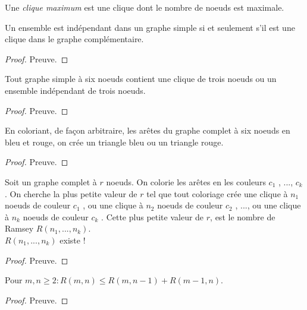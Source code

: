 \begin{mydef}
  Une \emph{clique maximum} est une clique dont le nombre de noeuds est maximale.
\end{mydef}

\begin{mytheo}
  Un ensemble est indépendant dans un graphe simple si et seulement s’il est une clique dans le graphe complémentaire.
  \begin{proof}
     Preuve.
  \end{proof}
\end{mytheo}

\begin{mytheo} 
  Tout graphe simple à six noeuds contient une clique de trois noeuds ou un ensemble indépendant de trois noeuds.
  \begin{proof}
     Preuve.
  \end{proof}
\end{mytheo}

\begin{mytheo} 
  En coloriant, de façon arbitraire, les arêtes du graphe complet à six noeuds en bleu et rouge, on crée un triangle bleu ou un triangle rouge.
  \begin{proof}
     Preuve.
  \end{proof}
\end{mytheo}

\begin{mytheo} 
  Soit un graphe complet à $r$ noeuds. On colorie les arêtes en les couleurs $c_1$ , ..., $c_k$ . On cherche la plus petite valeur de $r$ tel que tout coloriage crée une clique à $n_1$ noeuds de couleur $c_1$ , ou une clique à $n_2$ noeuds de couleur $c_2$ , ..., ou une clique à $n_k$ noeuds de couleur $c_k$ . Cette plus petite valeur de $r$, est le nombre de Ramsey $R(n_1 , ..., n_k)$.\\
  $R(n_1 , ..., n_k)$ existe !
  \begin{proof}
     Preuve.
  \end{proof}
\end{mytheo}

\begin{mytheo} 
  Pour $m, n \geq 2: R(m, n) \leq R(m, n-1) + R(m-1, n)$.
  \begin{proof}
     Preuve.
  \end{proof}
\end{mytheo}

